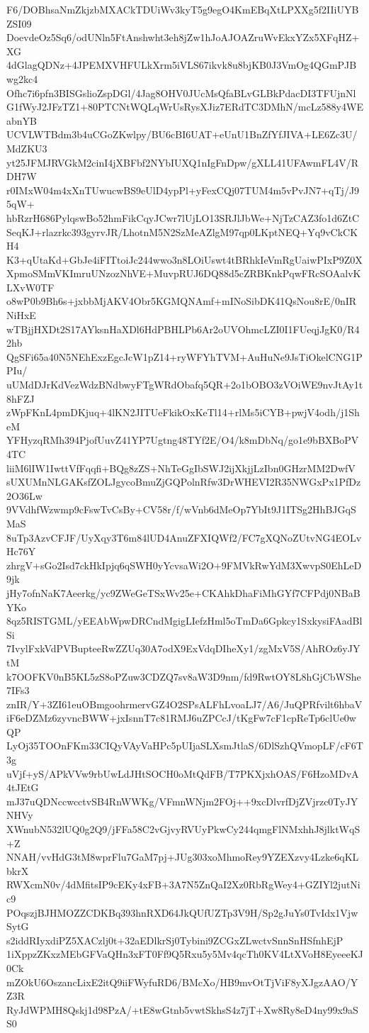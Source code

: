 F6/DOBhsaNmZkjzbMXACkTDUiWv3kyT5g9egO4KmEBqXtLPXXg5f2IIiUYBZSI09
DoevdeOz5Sq6/odUNln5FtAnshwht3eh8jZw1hJoAJOAZruWvEkxYZx5XFqHZ+XG
4dGlagQDNz+4JPEMXVHFULkXrm5iVLS67ikvk8u8bjKB0J3VmOg4QGmPJBwg2kc4
Ofhc7i6pfn3BISGslioZspDGl/4Jag8OHV0JUcMsQfaBLvGLBkPdacDI3TFUjnNl
G1fWyJ2JFzTZ1+80PTCNtWQLqWrUsRysXJiz7ERdTC3DMhN/mcLz588y4WEabnYB
UCVLWTBdm3b4uCGoZKwlpy/BU6cBI6UAT+eUnU1BnZfYfJIVA+LE6Zc3U/MdZKU3
yt25JFMJRVGkM2cinI4jXBFbf2NYbIUXQ1nIgFnDpw/gXLL41UFAwmFL4V/RDH7W
r0IMxW04m4xXnTUwucwBS9eUlD4ypPl+yFexCQj07TUM4m5vPvJN7+qTj/J95qW+
hbRzrH686PylqswBo52hmFikCqyJCwr7lUjLO13SRJlJbWe+NjTzCAZ3fo1d6ZtC
SeqKJ+rlazrkc393gyrvJR/LhotnM5N2SzMeAZlgM97qp0LKptNEQ+Yq9vCkCKH4
K3+qUtaKd+GbJe4iFITtoiJc244wwo3n8LOiUswt4tBRhkIeVmRgUaiwPIxP9Z0X
XpmoSMmVKImruUNzozNhVE+MuvpRUJ6DQ88d5cZRBKnkPqwFRcSOAalvKLXvW0TF
o8wP0b9Bh6s+jxbbMjAKV4Obr5KGMQNAmf+mINoSibDK41QsNou8rE/0nIRNiHxE
wTBjjHXDt2S17AYksnHaXDl6HdPBHLPb6Ar2oUVOhmcLZI0I1FUeqjJgK0/R42hb
QgSFi65a40N5NEhExzEgcJcW1pZ14+ryWFYhTVM+AuHuNe9JsTiOkelCNG1PPIu/
uUMdDJrKdVezWdzBNdbwyFTgWRdObafq5QR+2o1bOBO3zVOiWE9nvJtAy1t8hFZJ
zWpFKnL4pmDKjuq+4lKN2JITUeFkikOxKeTl14+rlMs5iCYB+pwjV4odh/j1SheM
YFHyzqRMh394PjofUuvZ41YP7Ugtng48TYf2E/O4/k8mDbNq/go1e9bBXBoPV4TC
liiM6lIW1IwttVfFqqfi+BQg8zZS+NhTeGgIbSWJ2ijXkjjLzIbn0GHzrMM2DwfV
sUXUMnNLGAKsfZOLJgycoBmuZjGQPolnRfw3DrWHEVI2R35NWGxPx1PfDz2O36Lw
9VVdhfWzwmp9cFswTvCsBy+CV58r/f/wVnb6dMeOp7YbIt9J1ITSg2HhBJGqSMaS
8uTp3AzvCFJF/UyXqy3T6m84lUD4AnuZFXIQWf2/FC7gXQNoZUtvNG4EOLvHc76Y
zhrgV+sGo2Isd7ckHkIpjq6qSWH0yYcvsaWi2O+9FMVkRwYdM3XwvpS0EhLeD9jk
jHy7ofnNaK7Aeerkg/yc9ZWeGeTSxWv25e+CKAhkDhaFiMhGYf7CFPdj0NBaBYKo
8qz5RISTGML/yEEAbWpwDRCndMgigLIefzHml5oTmDa6Gpkcy1SxkysiFAadBlSi
7IvylFxkVdPVBupteeRwZZUq30A7odX9ExVdqDIheXy1/zgMxV5S/AhROz6yJYtM
k7OOFKV0nB5KL5zS8oPZuw3CDZQ7sv8aW3D9nm/fd9RwtOY8L8hGjCbWShe7IFs3
znIR/Y+3ZI61euOBmgoohrmervGZ4O2SPsALFhLvoaLJ7/A6/JuQPRfvilt6hbaV
iF6eDZMz6zyvncBWW+jxIsnnT7c81RMJ6uZPCcJ/tKgFw7cF1cpReTp6clUe0wQP
LyOj35TOOnFKm33CIQyVAyVaHPc5pUIjaSLXsmJtlaS/6DlSzhQVmopLF/cF6T3g
uVjf+yS/APkVVw9rbUwLdJHtSOCH0oMtQdFB/T7PKXjxhOAS/F6HzoMDvA4tJEtG
mJ37uQDNccwcctvSB4RnWWKg/VFmnWNjm2FOj++9xcDlvrfDjZVjrzc0TyJYNHVy
XWnubN532lUQ0g2Q9/jFFa58C2vGjvyRVUyPkwCy244qmgFlNMxhhJ8jlktWqS+Z
NNAH/vvHdG3tM8wprFlu7GaM7pj+JUg303xoMhmoRey9YZEXzvy4Lzke6qKLbkrX
RWXcmN0v/4dMfitsIP9cEKy4xFB+3A7N5ZnQaI2Xz0RbRgWey4+GZIYl2jutNic9
POqszjBJHMOZZCDKBq393hnRXD64JkQUfUZTp3V9H/Sp2gJuYs0TvIdx1VjwSytG
s2iddRIyxdiPZ5XACzlj0t+32aEDlkrSj0Tybini9ZCGxZLwctvSnnSnHSfnhEjP
1iXppzZKxzMEbGFVaQHn3xFT0Ff9Q5Rxu5y5Mv4qcTh0KV4LtXVoH8EyeeeKJ0Ck
mZOkU6OszancLixE2itQ9iiFWyfuRD6/BMcXo/HB9mvOtTjViF8yXJgzAAO/YZ3R
RyJdWPMH8Qskj1d98PzA/+tE8wGtnb5vwtSkhsS4z7jT+Xw8Ry8eD4ny99x9aSS0
